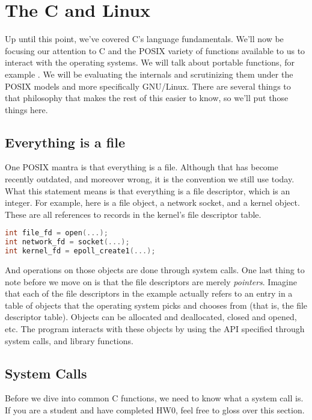 \section{The C and Linux}

Up until this point, we've covered C's language fundamentals.
We'll now be focusing our attention to C and the POSIX variety of functions available to us to interact with the operating systems.
We will talk about portable functions, for example  .
We will be evaluating the internals and scrutinizing them under the POSIX models and more specifically GNU/Linux.
There are several things to that philosophy that makes the rest of this easier to know, so we'll put those things here.

\subsection{Everything is a file}

One POSIX mantra is that everything is a file.
Although that has become recently outdated, and moreover wrong, it is the convention we still use today.
What this statement means is that everything is a file descriptor, which is an integer.
For example, here is a file object, a network socket, and a kernel object.
These are all references to records in the kernel's file descriptor table.

\begin{lstlisting}[language=C]
int file_fd = open(...);
int network_fd = socket(...);
int kernel_fd = epoll_create1(...);
\end{lstlisting}

And operations on those objects are done through system calls.
One last thing to note before we move on is that the file descriptors are merely \textit{pointers}.
Imagine that each of the file descriptors in the example actually refers to an entry in a table of objects that the operating system picks and chooses from (that is, the file descriptor table).
Objects can be allocated and deallocated, closed and opened, etc.
The program interacts with these objects by using the API specified through system calls, and library functions.

\subsection{System Calls}

Before we dive into common C functions, we need to know what a system call is.
If you are a student and have completed HW0, feel free to gloss over this section.

